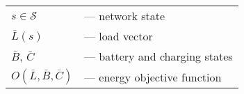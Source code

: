 \documentclass[]{article}
\begin{document}
\selectfont

\begin{tabular}{ll}
$s \in \mathcal{S}$ & --- network state\\
$\bar{L}(s)$ & --- load vector\\
$\bar{B}$, $\bar{C}$ & --- battery and charging states\\
$O(\bar{L}, \bar{B}, \bar{C})$ & --- energy objective function\\
\end{tabular}
\end{document}
